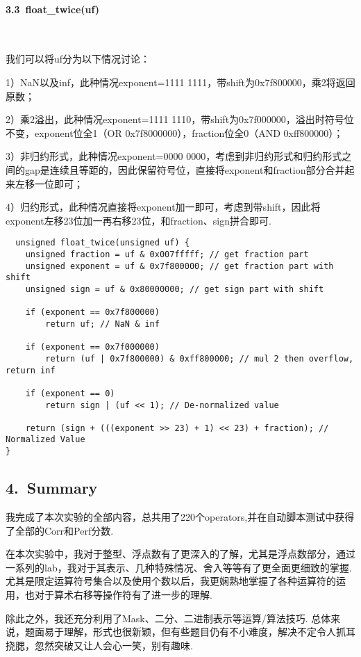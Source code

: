 \documentclass[UTF8]{ctexart}
\begin{document}
\paragraph*{3.3\ float\_twice(uf)}\ \par
我们可以将uf分为以下情况讨论：\par
1）NaN以及inf，此种情况exponent=1111 1111，带shift为0x7f800000，乘2将返回原数；\par
2）乘2溢出，此种情况exponent=1111 1110，带shift为0x7f000000，溢出时符号位不变，exponent位全1（OR 0x7f8000000），fraction位全0（AND 0xff800000）；\par
3）非归约形式，此种情况exponent=0000 0000，考虑到非归约形式和归约形式之间的gap是连续且等距的，因此保留符号位，直接将exponent和fraction部分合并起来左移一位即可；\par
4）归约形式，此种情况直接将exponent加一即可，考虑到带shift，因此将exponent左移23位加一再右移23位，和fraction、sign拼合即可.
\begin{lstlisting}
  unsigned float_twice(unsigned uf) {
    unsigned fraction = uf & 0x007fffff; // get fraction part
    unsigned exponent = uf & 0x7f800000; // get fraction part with shift
    unsigned sign = uf & 0x80000000; // get sign part with shift

    if (exponent == 0x7f800000)
        return uf; // NaN & inf

    if (exponent == 0x7f000000)
        return (uf | 0x7f800000) & 0xff800000; // mul 2 then overflow, return inf

    if (exponent == 0)
        return sign | (uf << 1); // De-normalized value

    return (sign + (((exponent >> 23) + 1) << 23) + fraction); // Normalized Value
}

\end{lstlisting}

\subsection*{4.\ Summary}
我完成了本次实验的全部内容，总共用了220个operators,并在自动脚本测试中获得了全部的Corr和Perf分数.\par
在本次实验中，我对于整型、浮点数有了更深入的了解，尤其是浮点数部分，通过一系列的lab，我对于其表示、几种特殊情况、舍入等等有了更全面更细致的掌握. 尤其是限定运算符号集合以及使用个数以后，我更娴熟地掌握了各种运算符的运用，也对于算术右移等操作符有了进一步的理解.\par
除此之外，我还充分利用了Mask、二分、二进制表示等运算/算法技巧. 总体来说，题面易于理解，形式也很新颖，但有些题目仍有不小难度，解决不定令人抓耳挠腮，忽然突破又让人会心一笑，别有趣味.
\end{document}
